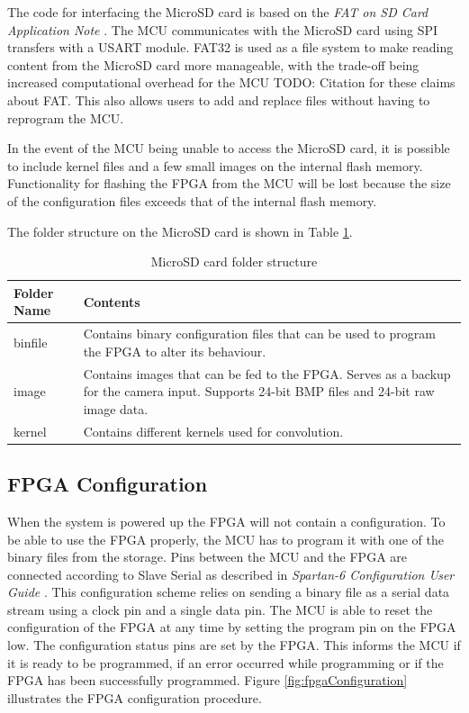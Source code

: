 The code for interfacing the MicroSD card is based on the \textit{FAT on SD Card Application Note} \cite{an0030}. The MCU communicates with the MicroSD card using SPI transfers with a USART module. FAT32 is used as a file system to make reading content from the MicroSD card more manageable, with the trade-off being increased computational overhead for the MCU TODO: Citation for these claims about FAT. This also allows users to add and replace files without having to reprogram the MCU.

In the event of the MCU being unable to access the MicroSD card, it is possible to include kernel files and a few small images on the internal flash memory. Functionality for flashing the FPGA from the MCU will be lost because the size of the configuration files exceeds that of the internal flash memory.

The folder structure on the MicroSD card is shown in Table \ref{microsd_folder}.

\begin{table}[h!]
\centering
	\begin{tabular}{ l p{10cm} }
		
		Folder Name & Contents \\ \hline
		binfile & Contains binary configuration files that can be used to program the FPGA to alter its behaviour. \\ \hline
		image & Contains images that can be fed to the FPGA. Serves as a backup for the camera input. Supports 24-bit BMP files and 24-bit raw image data. \\ \hline
		kernel & Contains different kernels used for convolution.
	\end{tabular}
	\caption{MicroSD card folder structure}
	\label{microsd_folder}
\end{table}


\subsection{FPGA Configuration}
When the system is powered up the FPGA will not contain a configuration. To be able to use the FPGA properly, the MCU has to program it with one of the binary files from the storage. Pins between the MCU and the FPGA are connected according to Slave Serial as described in \textit{Spartan-6 Configuration User Guide} \cite[Page 28]{ug380}. This configuration scheme relies on sending a binary file as a serial data stream using a clock pin and a single data pin. The MCU is able to reset the configuration of the FPGA at any time by setting the program pin on the FPGA low. The configuration status pins are set by the FPGA. This informs the MCU if it is ready to be programmed, if an error occurred while programming or if the FPGA has been successfully programmed. Figure \ref{fig:fpgaConfiguration} illustrates the FPGA configuration procedure. 


